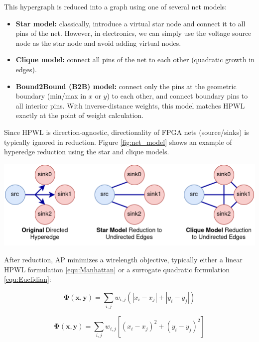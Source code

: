 This hypergraph is reduced into a graph using one of several net models:
\begin{itemize}
    \item \textbf{Star model:} classically, introduce a virtual star node and connect it to all pins of the net. However, in electronics, we can simply use the voltage source node as the star node and avoid adding virtual nodes.
    \item \textbf{Clique model:} connect all pins of the net to each other (quadratic growth in edges). 
    \item \textbf{Bound2Bound (B2B) model:} connect only the pins at the geometric boundary (min/max in $x$ or $y$) to each other, and connect boundary pins to all interior pins. With inverse-distance weights, this model matches HPWL exactly at the point of weight calculation.
\end{itemize}

Since HPWL is direction-agnostic, directionality of FPGA nets (source/sinks) is typically ignored in reduction. Figure \ref{fig:net_model} shows an example of hyperedge reduction using the star and clique models.

\vspace{1.0cm}
{
    \centering
    \includegraphics[width=\columnwidth]{figures/future_work/net_model.png}
    \label{fig:net_model}
}

After reduction, AP minimizes a wirelength objective, typically either a linear HPWL formulation \eqref{equ:Manhattan} or a surrogate quadratic formulation \eqref{equ:Euclidian}:

\begin{equation}
    \boldsymbol{\Phi} (\boldsymbol{x}, \boldsymbol{y}) = \sum_{i,j} w_{i,j} \left( |x_i - x_j| + |y_i - y_j| \right)
    \label{equ:Manhattan}
\end{equation}

\begin{equation}
    \boldsymbol{\Phi} (\boldsymbol{x}, \boldsymbol{y}) = \sum_{i,j} w_{i,j} \left[ (x_i - x_j)^2 + (y_i - y_j)^2 \right]
    \label{equ:Euclidian}
\end{equation}


